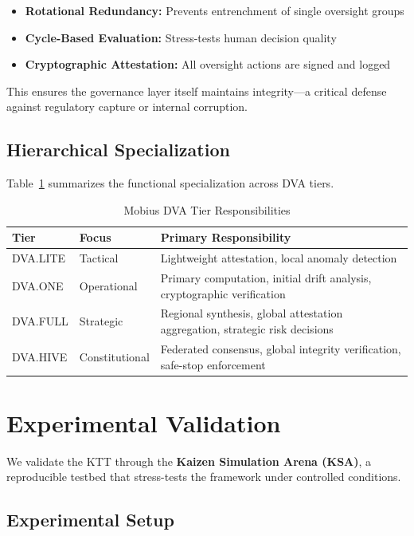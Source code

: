 \documentclass[11pt,letterpaper]{article}
\begin{document}
\begin{itemize}
    \item \textbf{Rotational Redundancy:} Prevents entrenchment of single oversight groups
    \item \textbf{Cycle-Based Evaluation:} Stress-tests human decision quality
    \item \textbf{Cryptographic Attestation:} All oversight actions are signed and logged
\end{itemize}

This ensures the governance layer itself maintains integrity—a critical defense against regulatory capture or internal corruption.

\subsection{Hierarchical Specialization}

Table~\ref{tab:dva_tiers} summarizes the functional specialization across DVA tiers.

\begin{table}[h]
\centering
\caption{Mobius DVA Tier Responsibilities}
\label{tab:dva_tiers}
\begin{tabular}{@{}llp{5cm}@{}}
\toprule
\textbf{Tier} & \textbf{Focus} & \textbf{Primary Responsibility} \\
\midrule
DVA.LITE & Tactical & Lightweight attestation, local anomaly detection \\
DVA.ONE & Operational & Primary computation, initial drift analysis, cryptographic verification \\
DVA.FULL & Strategic & Regional synthesis, global attestation aggregation, strategic risk decisions \\
DVA.HIVE & Constitutional & Federated consensus, global integrity verification, safe-stop enforcement \\
\bottomrule
\end{tabular}
\end{table}

\section{Experimental Validation}
\label{sec:experiments}

We validate the KTT through the \textbf{Kaizen Simulation Arena (KSA)}, a reproducible testbed that stress-tests the framework under controlled conditions.

\subsection{Experimental Setup}
\end{document}

